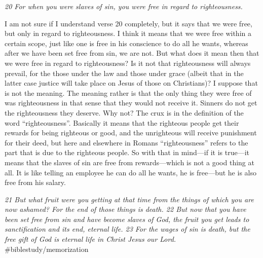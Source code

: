 \emph{20 For when you were slaves of sin, you were free in regard to
righteousness.}

I am not sure if I understand verse 20 completely, but it says that we
were free, but only in regard to righteousness. I think it means that we
were free within a certain scope, just like one is free in his
conscience to do all he wants, whereas after we have been set free from
sin, we are not. But what does it mean then that we were free in regard
to righteousness? Is it not that righteousness will always prevail, for
the those under the law and those under grace (albeit that in the latter
case justice will take place on Jesus of those on Christians)? I suppose
that is not the meaning. The meaning rather is that the only thing they
were free of was righteousness in that sense that they would not receive
it. Sinners do not get the righteousness they deserve. Why not? The crux
is in the definition of the word ``righteousness''. Basically it means
that the righteous people get their rewards for being righteous or good,
and the unrighteous will receive punishment for their deed, but here and
elsewhere in Romans ``righteousness'' refers to the part that is due to
the righteous people. So with that in mind---if it is true---it means
that the slaves of sin are free from rewards---which is not a good thing
at all. It is like telling an employee he can do all he wants, he is
free---but he is also free from his salary.

\emph{21 But what fruit were you getting at that time from the things of
which you are now ashamed? For the end of those things is death. 22 But
now that you have been set free from sin and have become slaves of God,
the fruit you get leads to sanctification and its end, eternal life.
23 For the wages of sin is death, but the free gift of God is eternal
life in Christ Jesus our Lord.} \#biblestudy/memorization


